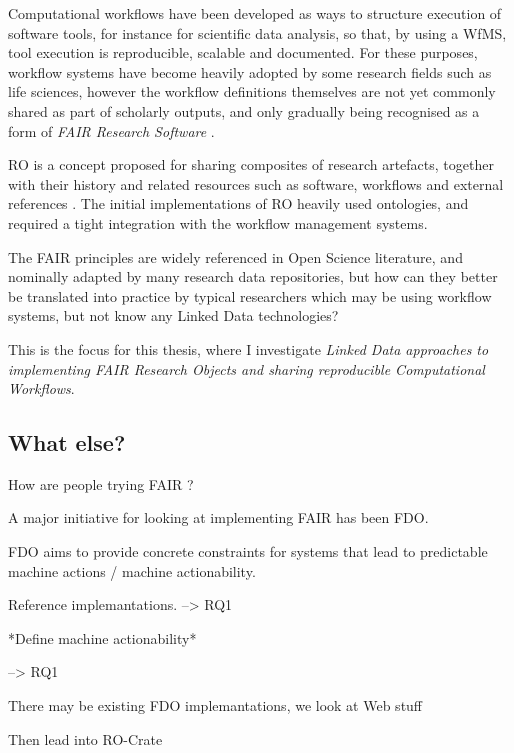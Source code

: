 Computational \glspl{workflow} have been developed as ways to structure execution of software tools, for instance for scientific data analysis, so that, by using a \gls{WfMS}, tool execution is reproducible, scalable and documented. For these purposes, workflow systems have become heavily adopted by some research fields such as life sciences, however the workflow definitions themselves are not yet commonly shared as part of scholarly outputs, and only gradually being recognised as a form of \emph{FAIR Research Software} \cite{Katz 2021b}. 

\acrfull{RO} is a concept proposed for sharing composites of research artefacts, together with their history and related resources such as software, workflows and external references \cite{Bechhofer 2013}. The initial implementations of RO heavily used ontologies, and required a tight integration with the workflow management systems. 
 
The FAIR principles are widely referenced in Open Science literature, and nominally adapted by many research data repositories, but how can they better be translated into practice by typical researchers which may be using workflow systems, but not know any Linked Data technologies? 

This is the focus for this thesis, where I investigate \emph{Linked Data approaches to implementing FAIR Research Objects and sharing reproducible Computational Workflows}.

\subsection{What else?}




How are people trying FAIR ? 

A major initiative for looking at implementing FAIR has been FDO.

FDO aims to provide concrete constraints for systems that lead to predictable machine actions / machine actionability.

Reference implemantations. --> RQ1

*Define machine actionability*

--> RQ1

There may be existing FDO implemantations, we look at Web stuff


Then lead into RO-Crate


